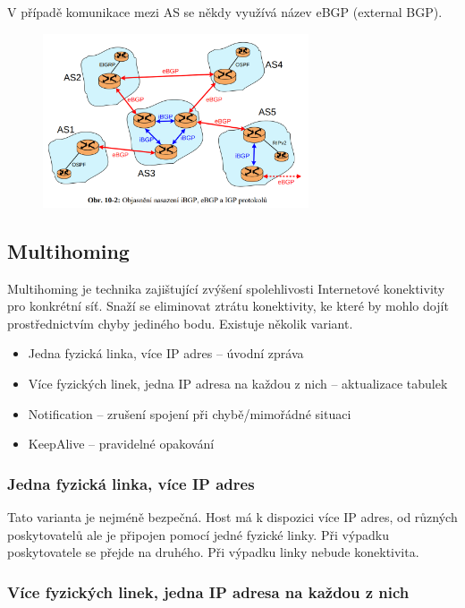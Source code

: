 V případě komunikace mezi AS se někdy využívá název eBGP (external BGP).

\begin{figure}[!h]
    \centering
    \includegraphics[width=0.7\textwidth]{obrazky/090.png}
\end{figure}


\subsection{Multihoming}

Multihoming je technika zajištující zvýšení spolehlivosti Internetové konektivity pro konkrétní síť.
Snaží se eliminovat ztrátu konektivity, ke které by mohlo dojít prostřednictvím chyby jediného bodu.
Existuje několik variant.

\begin{itemize}[noitemsep]
        \item Jedna fyzická linka, více IP adres -- úvodní zpráva
        \item Více fyzických linek, jedna IP adresa na každou z nich -- aktualizace tabulek
        \item Notification -- zrušení spojení při chybě/mimořádné situaci
        \item KeepAlive -- pravidelné opakování
\end{itemize}

\subsubsection{Jedna fyzická linka, více IP adres}

Tato varianta je nejméně bezpečná.
Host má k dispozici více IP adres, od různých poskytovatelů ale je připojen pomocí jedné fyzické linky.
Při výpadku poskytovatele se přejde na druhého.
Při výpadku linky nebude konektivita.

\subsubsection{Více fyzických linek, jedna IP adresa na každou z nich}

